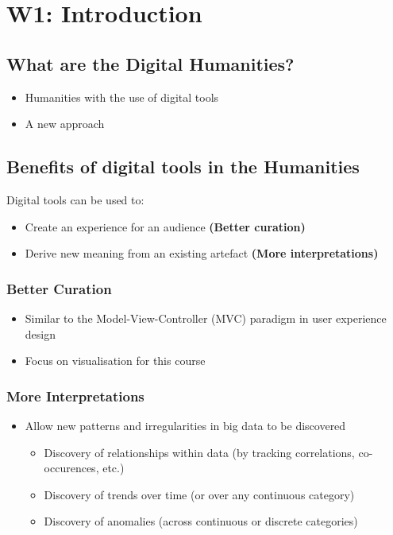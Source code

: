 \documentclass[a4paper]{article}
\begin{document}
\newpage
\section{W1: Introduction}

\subsection{What are the Digital Humanities?}
\begin{itemize}
    \item Humanities with the use of digital tools
    \item A new approach
\end{itemize}

\subsection{Benefits of digital tools in the Humanities}
Digital tools can be used to:
\begin{itemize}
    \item Create an experience for an audience \textbf{(Better curation)}
    \item Derive new meaning from an existing artefact \textbf{(More interpretations)}
\end{itemize}

\subsubsection{Better Curation}
\begin{itemize}
    \item Similar to the Model-View-Controller (MVC) paradigm in user experience design
    \item Focus on visualisation for this course
\end{itemize}

\subsubsection{More Interpretations}
\begin{itemize}
    \item Allow new patterns and irregularities in big data to be discovered
    \begin{itemize}[label=$\circ$]
        \item Discovery of relationships within data (by tracking correlations, co-occurences, etc.)
        \item Discovery of trends over time (or over any continuous category)
        \item Discovery of anomalies (across continuous or discrete categories)
    \end{itemize}
\end{itemize}
\end{document}
